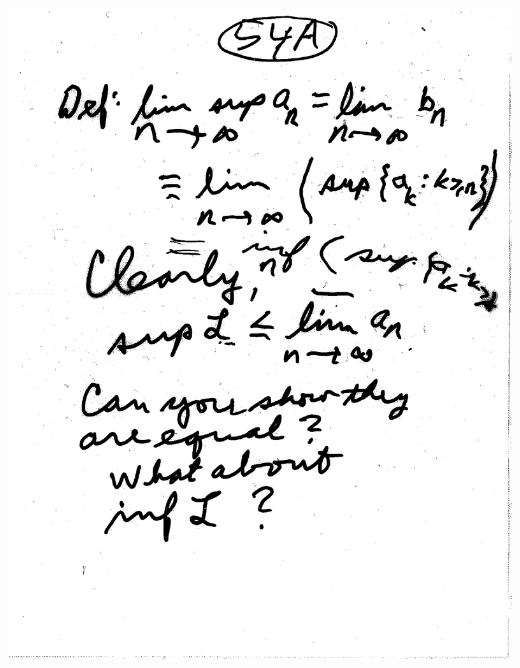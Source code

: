 \documentclass[10pt,a4paper]{article}
\begin{document}
{{\includegraphics[scale=.4]{Pages/LC_2}

}}
\end{document}
